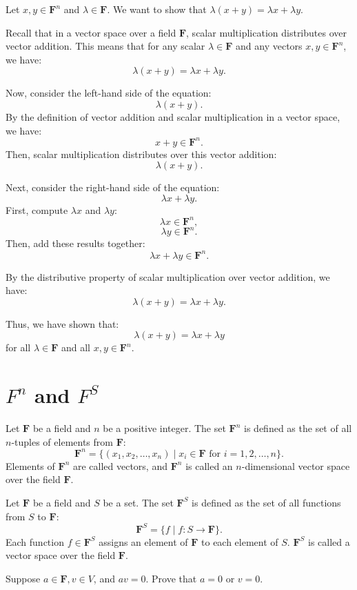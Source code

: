 \begin{solution}
Let $x, y \in \mathbf{F}^{n}$ and $\lambda \in \mathbf{F}$. We want to show that $\lambda(x + y) = \lambda x + \lambda y$.

Recall that in a vector space over a field $\mathbf{F}$, scalar multiplication distributes over vector addition. This means that for any scalar $\lambda \in \mathbf{F}$ and any vectors $x, y \in \mathbf{F}^{n}$, we have:
\[
\lambda(x + y) = \lambda x + \lambda y.
\]

Now, consider the left-hand side of the equation:
\[
\lambda(x + y).
\]
By the definition of vector addition and scalar multiplication in a vector space, we have:
\[
x + y \in \mathbf{F}^{n}.
\]
Then, scalar multiplication distributes over this vector addition:
\[
\lambda(x + y).
\]

Next, consider the right-hand side of the equation:
\[
\lambda x + \lambda y.
\]
First, compute $\lambda x$ and $\lambda y$:
\[
\lambda x \in \mathbf{F}^{n},
\]
\[
\lambda y \in \mathbf{F}^{n}.
\]
Then, add these results together:
\[
\lambda x + \lambda y \in \mathbf{F}^{n}.
\]

By the distributive property of scalar multiplication over vector addition, we have:
\[
\lambda(x + y) = \lambda x + \lambda y.
\]

Thus, we have shown that:
\[
\lambda(x + y) = \lambda x + \lambda y
\]
for all $\lambda \in \mathbf{F}$ and all $x, y \in \mathbf{F}^{n}$.
\end{solution}

\section{$F^n$ and $F^S$}
\begin{definition}[$F^n$]
Let $\mathbf{F}$ be a field and $n$ be a positive integer. The set $\mathbf{F}^n$ is defined as the set of all $n$-tuples of elements from $\mathbf{F}$:
\[
\mathbf{F}^n = \{ (x_1, x_2, \ldots, x_n) \mid x_i \in \mathbf{F} \text{ for } i = 1, 2, \ldots, n \}.
\]
Elements of $\mathbf{F}^n$ are called vectors, and $\mathbf{F}^n$ is called an $n$-dimensional vector space over the field $\mathbf{F}$.
\end{definition}
\begin{definition}[$F^S$]
Let $\mathbf{F}$ be a field and $S$ be a set. The set $\mathbf{F}^S$ is defined as the set of all functions from $S$ to $\mathbf{F}$:
\[
\mathbf{F}^S = \{ f \mid f: S \to \mathbf{F} \}.
\]
Each function $f \in \mathbf{F}^S$ assigns an element of $\mathbf{F}$ to each element of $S$. $\mathbf{F}^S$ is called a vector space over the field $\mathbf{F}$.
\end{definition}
\begin{exercise}
Suppose $a \in \mathbf{F}, v \in V$, and $av = 0$. Prove that $a = 0$ or $v = 0$. 
\end{exercise}

